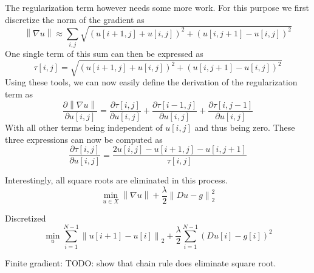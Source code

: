 \documentclass{paper}
\newcommand{\norm}[1]{\left\lVert#1\right\rVert}
\begin{document}
The regularization term however needs some more work. 
For this purpose we first discretize the norm of the gradient as
\begin{equation}
\norm{\nabla u} \approx \sum_{i,j} \sqrt{(u[i+1,j] + u[i,j])^2 + (u[i, j+1] - u[i, j])^2}
\end{equation}
One single term of this sum can then be expressed as
\begin{equation}
\tau[i,j] = \sqrt{(u[i+1,j] + u[i,j])^2 + (u[i, j+1] - u[i, j])^2}
\end{equation}
Using these tools, we can now easily define the derivation of the regularization term as
\begin{equation}
\frac{\partial \norm{\nabla u}}{\partial u[i,j]} = 
	\frac{\partial \tau[i,j]}{\partial u[i,j]} +
	\frac{\partial \tau[i - 1,j]}{\partial u[i,j]} +
	\frac{\partial \tau[i,j - 1]}{\partial u[i,j]}
\end{equation}
With all other terms being independent of $u[i,j]$ and thus being zero.
These three expressions can now be computed as
\begin{equation}
\frac{\partial \tau[i,j]}{\partial u[i,j]} = 
	\frac{2u[i,j] - u[i + 1, j] - u[i, j+1]}{\tau[i,j]}
\end{equation}

Interestingly, all square roots are eliminated in this process.
\begin{equation}
\min_{u \in X} \norm{\nabla u} + \frac{\lambda}{2} \norm{Du - g}^2_2
\end{equation}

Discretized 
\begin{equation}
\min_{u} \sum_{i=1}^{N-1} \norm{u[i+1] - u[i]}_2 + 
\frac{\lambda}{2} \sum_{i=1}^{N-1} (Du[i] - g[i])^2
\end{equation}

Finite gradient:
TODO: show that chain rule does eliminate square root.
\end{document}
